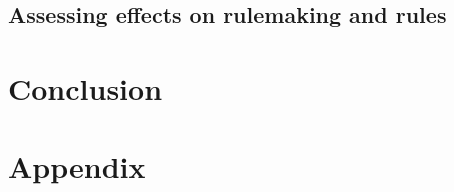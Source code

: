 \documentclass{article}
\begin{document}


% 

\subsection{Assessing effects on rulemaking and rules} \label{influence-methods}













% 



\section{Conclusion}


\newpage
\section{Appendix}
\end{document}
